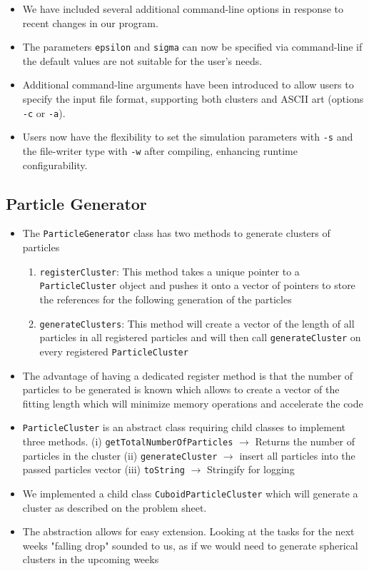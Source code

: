 \documentclass{article}
\begin{document}
\begin{itemize}
    \item We have included several additional command-line options in response to recent changes in our program.
    \item The parameters \texttt{epsilon} and \texttt{sigma} can now be specified via command-line if the default values are not suitable for the user's needs.
    \item Additional command-line arguments have been introduced to allow users to specify the input file format, supporting both clusters and ASCII art (options \texttt{-c} or \texttt{-a}).
    \item Users now have the flexibility to set the simulation parameters with \texttt{-s} and the file-writer type with \texttt{-w} after compiling, enhancing runtime configurability.
\end{itemize}

\subsection{Particle Generator}
\label{subsec:particleGenerator}

\begin{itemize}
    \item The \verb|ParticleGenerator| class has two methods to generate clusters of particles
    \begin{enumerate}
        \item \verb|registerCluster|: This method takes a unique pointer to a \verb|ParticleCluster| object and pushes it onto a vector of pointers to store the references for the following generation of the particles
        \item \verb|generateClusters|: This method will create a vector of the length of all particles in all registered particles and will then call \verb|generateCluster| on every registered \verb|ParticleCluster|
    \end{enumerate}
    \item The advantage of having a dedicated register method is that the number of particles to be generated is known which allows to create a vector of the fitting length which will minimize memory operations and accelerate the code
    \item \verb|ParticleCluster| is an abstract class requiring child classes to implement three methods. (i) \verb|getTotalNumberOfParticles| $\rightarrow$ Returns the number of particles in the cluster (ii) \verb|generateCluster| $\rightarrow$ insert all particles into the passed particles vector (iii) \verb|toString| $\rightarrow$ Stringify for logging
    \item We implemented a child class \verb|CuboidParticleCluster| which will generate a cluster as described on the problem sheet.
    \item The abstraction allows for easy extension. Looking at the tasks for the next weeks "falling drop" sounded to us, as if we would need to generate spherical clusters in the upcoming weeks
\end{itemize}
\end{document}
